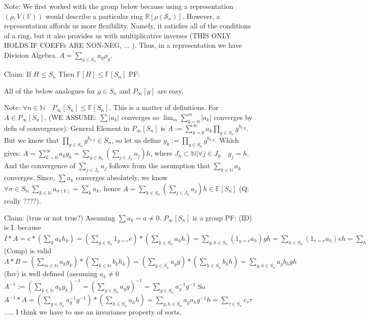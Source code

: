\documentclass{article}
\theoremstyle{definition}
\begin{document}
Note: We first worked with the group below because using a representation $(\rho, V(\mathbb{F}))$ would describe a particular ring $ \mathbb{R}[\rho(\mathcal{S}_n)] $. However, a representation affords us more flexibility. Namely, it satisfies all of the conditions of a ring, but it also provides us with multiplicative inverses (THIS ONLY HOLDS IF COEFFs ARE NON-NEG, ... ). Thus, in a representation we have Division Algebra.
$A = \sum_{g\in S_n} a_g \rho_g $. 



Claim: If $ H \leq S_n $ Then  $ \mathbb{F}[H] \leq  \mathbb{F}[S_n]  $
PF:

All of the below analogues for $g\in S_n$ and  $P_\infty[g]$ are easy.

Note: $\forall n \in \mathbb{N} \quad  P_\infty[S_n] \leq \mathbb{F}[S_n]  $. This is a matter of definitions. For $ A \in P_\infty[S_n]$,  (WE ASSUME: $\sum |a_k|$ converges  so $\lim_m \sum_{k=0}^m |a_k| $ converges by defn of convergence). General Element in $P_\infty[S_n] $ is $A := \sum_{k=0}^\infty a_k \prod_{g \in S_n}  g^{b_{k,g}} $. But we know that $\prod_{g \in S_n}  g^{b_{k,g} }\in S_n $, so let us define $g_k := \prod_{g \in S_n}  g^{b_{k,g} } $. Which gives: $A = \sum_{k =0}^\infty a_k g_k = \sum_{g \in S_n} (\sum_{j \in J_h} a_j) h$, where $ J_h \subset \mathbb{N} | \forall j \in J_h \quad g_j = h $. And the convergence of $\sum_{j \in J_h} a_j $ follows from the assumption that $\sum_{k \in \mathbb{N}} a_k$ converges. Since, $\sum a_k $ converges absolutely, we know $\forall \sigma \in S_\mathbb{N} \: \sum_{k \in \mathbb{N} } a_{\sigma(k) } = \sum_{k} a_{k} $, hence $ 
A = \sum_{h \in S_n} (\sum_{j \in J_h} a_j)h \in \mathbb{F}[S_n]  $ (Q: really ????).

Claim: (true or not true?) Assuming $\sum a_k = a \neq 0$. $P_\infty[S_n]$ is a group
PF:
(ID) is I. because
$ I *A  =  e*(\sum_{k} a_k h_k) = (\sum_{g \in S_n} 1_{g=e}e)*(\sum_{h \in S_n} a_h h) = \sum_{g,h \in S_n} (1_{g=e}a_h)gh = \sum_{h \in S_n} (1_{e=e}a_h)eh = \sum_{h \in S_n }a_h h = A$
(Comp) is valid
$A * B = (\sum_{m\in \mathbb{N}} a_k g_k) * (\sum_{k \in \mathbb{N}} b_k h_k) = (\sum_{g\in S_n} a_g g ) * (\sum_{h \in S_n } b_h h) = \sum_{g,h \in S_n} a_g b_h gh $
(Inv) is well defined (assuming $a_k \neq 0$
$ A^{-1} := (\sum_{k \in \mathbb{N}} a_k g_k)^{-1} = (\sum_{g\in S_n} a_g g)^{-1} = \sum_{g\in S_n} a_g^{-1} g^{-1}$
So  $ A^{-1} * A = (\sum_{g \in S_n} a_g^{-1} g^{-1}) * (\sum_{h \in S_n} a_h h) = \sum_{g,h \in S_n} a_g a_h g^{-1} h = \sum_{\tau \in S_n} c_\tau \tau$ 
..... I think we have to use an invariance property of sorts. 
\end{document}
